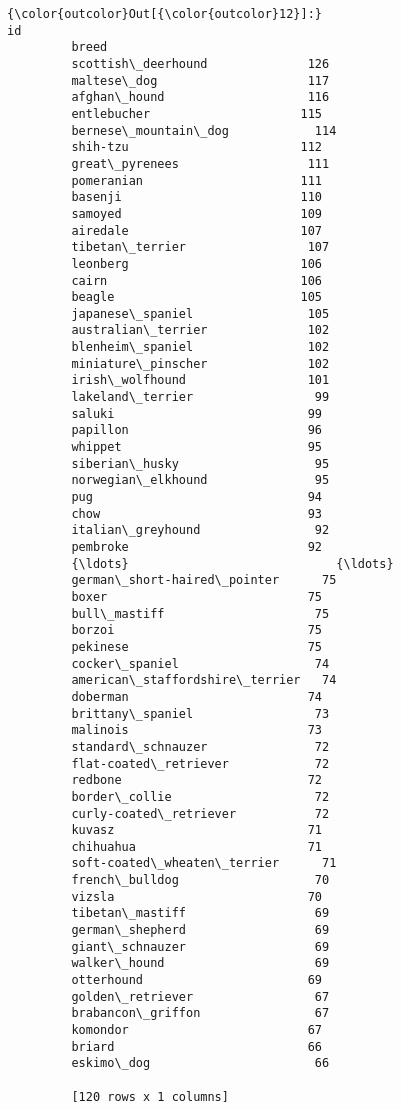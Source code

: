 \documentclass[11pt]{article}
\begin{document}
\begin{Verbatim}[commandchars=\\\{\}]
{\color{outcolor}Out[{\color{outcolor}12}]:}                                  id
         breed                              
         scottish\_deerhound              126
         maltese\_dog                     117
         afghan\_hound                    116
         entlebucher                     115
         bernese\_mountain\_dog            114
         shih-tzu                        112
         great\_pyrenees                  111
         pomeranian                      111
         basenji                         110
         samoyed                         109
         airedale                        107
         tibetan\_terrier                 107
         leonberg                        106
         cairn                           106
         beagle                          105
         japanese\_spaniel                105
         australian\_terrier              102
         blenheim\_spaniel                102
         miniature\_pinscher              102
         irish\_wolfhound                 101
         lakeland\_terrier                 99
         saluki                           99
         papillon                         96
         whippet                          95
         siberian\_husky                   95
         norwegian\_elkhound               95
         pug                              94
         chow                             93
         italian\_greyhound                92
         pembroke                         92
         {\ldots}                             {\ldots}
         german\_short-haired\_pointer      75
         boxer                            75
         bull\_mastiff                     75
         borzoi                           75
         pekinese                         75
         cocker\_spaniel                   74
         american\_staffordshire\_terrier   74
         doberman                         74
         brittany\_spaniel                 73
         malinois                         73
         standard\_schnauzer               72
         flat-coated\_retriever            72
         redbone                          72
         border\_collie                    72
         curly-coated\_retriever           72
         kuvasz                           71
         chihuahua                        71
         soft-coated\_wheaten\_terrier      71
         french\_bulldog                   70
         vizsla                           70
         tibetan\_mastiff                  69
         german\_shepherd                  69
         giant\_schnauzer                  69
         walker\_hound                     69
         otterhound                       69
         golden\_retriever                 67
         brabancon\_griffon                67
         komondor                         67
         briard                           66
         eskimo\_dog                       66
         
         [120 rows x 1 columns]
\end{Verbatim}
            
\end{document}
